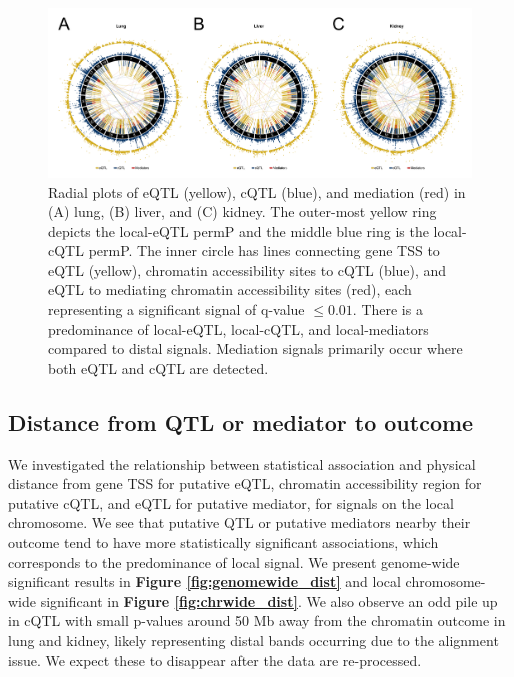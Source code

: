 \begin{figure}
\renewcommand{\familydefault}{\sfdefault}\normalfont
\centering
\includegraphics[width=\textwidth]{figures/6-mediation/all_circos.pdf}
\caption[eQTL, cQTL, and mediation signal is primarily local in lung, liver, and kidney]{Radial plots of eQTL (yellow), cQTL (blue), and mediation (red) in (A) lung, (B) liver, and (C) kidney. The outer-most yellow ring depicts the local-eQTL permP and the middle blue ring is the local-cQTL permP. The inner circle has lines connecting gene TSS to eQTL (yellow), chromatin accessibility sites to cQTL (blue), and eQTL to mediating chromatin accessibility sites (red), each representing a significant signal of q-value $\le 0.01$. There is a predominance of local-eQTL, local-cQTL, and local-mediators compared to distal signals. Mediation signals primarily occur where both eQTL and cQTL are detected.
\label{fig:circos_plot}}
\end{figure}

\subsection{Distance from QTL or mediator to outcome}

We investigated the relationship between statistical association and physical distance from gene TSS for putative eQTL, chromatin accessibility region for putative cQTL, and eQTL for putative mediator, for signals on the local chromosome. We see that putative QTL or putative mediators nearby their outcome tend to have more statistically significant associations, which corresponds to the predominance of local signal. We present genome-wide significant results in \textbf{Figure \ref{fig:genomewide_dist}} and local chromosome-wide significant in \textbf{Figure \ref{fig:chrwide_dist}}. We also observe an odd pile up in cQTL with small p-values around 50 Mb away from the chromatin outcome in lung and kidney, likely representing distal bands occurring due to the alignment issue. We expect these to disappear after the data are re-processed.

